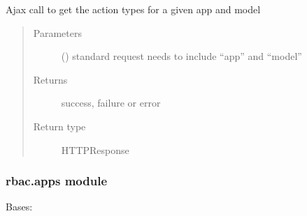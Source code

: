 \documentclass[letterpaper,10pt,english]{sphinxmanual}
\begin{document}

\begin{fulllineitems}
\label{\detokenize{rbac:rbac.ajax.rbac_get_action_for_model_ajax}}
Ajax call to get the action types for a given app and model
\begin{quote}\begin{description}
\item[{Parameters}] \leavevmode
{} () \textendash{} standard request \sphinxhyphen{} needs to include “app” and “model”

\item[{Returns}] \leavevmode
success, failure or error

\item[{Return type}] \leavevmode
HTTPResponse

\end{description}\end{quote}

\end{fulllineitems}



\subsubsection{rbac.apps module}
\label{\detokenize{rbac:module-rbac.apps}}\label{\detokenize{rbac:rbac-apps-module}}

\begin{fulllineitems}
\label{\detokenize{rbac:rbac.apps.RbacConfig}}
Bases: 

\begin{fulllineitems}
\label{\detokenize{rbac:rbac.apps.RbacConfig.name}}
\end{fulllineitems}


\end{fulllineitems}
\end{document}
